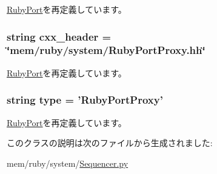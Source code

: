 \hyperlink{classSequencer_1_1RubyPort_a2508e7d3baa8674cfa2657be0bbd1361}{RubyPort}を再定義しています。\hypertarget{classSequencer_1_1RubyPortProxy_a17da7064bc5c518791f0c891eff05fda}{
\subsubsection[{cxx\_\-header}]{\setlength{\rightskip}{0pt plus 5cm}string {\bf cxx\_\-header} = \char`\"{}mem/ruby/{\bf system}/RubyPortProxy.hh\char`\"{}}}
\label{classSequencer_1_1RubyPortProxy_a17da7064bc5c518791f0c891eff05fda}


\hyperlink{classSequencer_1_1RubyPort_a17da7064bc5c518791f0c891eff05fda}{RubyPort}を再定義しています。\hypertarget{classSequencer_1_1RubyPortProxy_acce15679d830831b0bbe8ebc2a60b2ca}{
\subsubsection[{type}]{\setlength{\rightskip}{0pt plus 5cm}string {\bf type} = '{\bf RubyPortProxy}'}}
\label{classSequencer_1_1RubyPortProxy_acce15679d830831b0bbe8ebc2a60b2ca}


\hyperlink{classSequencer_1_1RubyPort_acce15679d830831b0bbe8ebc2a60b2ca}{RubyPort}を再定義しています。

このクラスの説明は次のファイルから生成されました:\begin{DoxyCompactItemize}
\item 
mem/ruby/system/\hyperlink{Sequencer_8py}{Sequencer.py}\end{DoxyCompactItemize}
